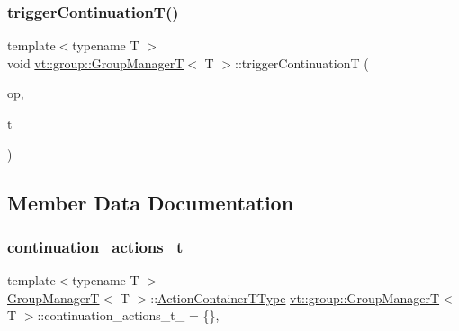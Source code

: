 \subsubsection{\texorpdfstring{trigger\+Continuation\+T()}{triggerContinuationT()}}
{\footnotesize\ttfamily template$<$typename T $>$ \\
void \hyperlink{structvt_1_1group_1_1_group_manager_t}{vt\+::group\+::\+Group\+ManagerT}$<$ T $>$\+::trigger\+ContinuationT (\begin{DoxyParamCaption}\item[{\hyperlink{namespacevt_1_1group_a73f2624ddeb535b39a08b6524f26b244}{Remote\+Operation\+I\+D\+Type} const}]{op,  }\item[{T}]{t }\end{DoxyParamCaption})\hspace{0.3cm}{\ttfamily [static]}}



\subsection{Member Data Documentation}
\mbox{\label{structvt_1_1group_1_1_group_manager_t_ace6828eddb4d595c12ea5c07047207d6}} 
\subsubsection{\texorpdfstring{continuation\+\_\+actions\+\_\+t\+\_\+}{continuation\_actions\_t\_}}
{\footnotesize\ttfamily template$<$typename T $>$ \\
\hyperlink{structvt_1_1group_1_1_group_manager_t}{Group\+ManagerT}$<$ T $>$\+::\hyperlink{structvt_1_1group_1_1_group_manager_t_adc0d6d680c4f8bdbb80cd90f84a5f7ee}{Action\+Container\+T\+Type} \hyperlink{structvt_1_1group_1_1_group_manager_t}{vt\+::group\+::\+Group\+ManagerT}$<$ T $>$\+::continuation\+\_\+actions\+\_\+t\+\_\+ = \{\}\hspace{0.3cm}{\ttfamily [static]}, {\ttfamily [private]}}

\mbox{\label{structvt_1_1group_1_1_group_manager_t_a294adcb4f4b41892733f29b9dea70f9e}} 
